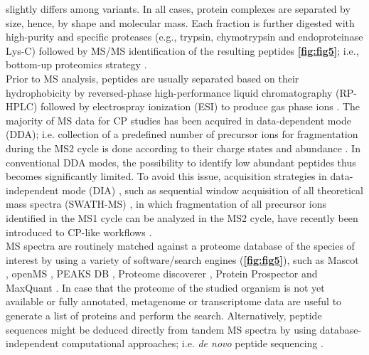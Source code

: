 \newpage
slightly differs among variants. In all cases, protein complexes are separated by size, hence, by shape and molecular mass. Each fraction is further digested with high-purity and specific proteases (e.g., trypsin, chymotrypsin and endoproteinase Lys-C) followed by MS/MS identification of the resulting peptides \textbf{\autoref{fig:fig5}}; i.e., bottom-up proteomics strategy \cite{Zhang_2013}.\\
Prior to MS analysis, peptides are usually separated based on their hydrophobicity by reversed-phase high-performance liquid chromatography (RP-HPLC) followed by electrospray ionization (ESI) to produce gas phase ions \cite{Zhang_2013}. The majority of MS data for CP studies has been acquired in data-dependent mode (DDA); i.e. collection of a predefined number of precursor ions for fragmentation during the MS2 cycle is done according to their charge states and abundance \cite{Hu_2016}. In conventional DDA modes, the possibility to identify low abundant peptides thus becomes significantly limited. To avoid this issue, acquisition strategies in data-independent mode (DIA) \cite{Krasny_2021}, such as sequential window acquisition of all theoretical mass spectra (SWATH-MS) \cite{Gillet_2012}, in which fragmentation of all precursor ions identified in the MS1 cycle can be analyzed in the MS2 cycle, have recently been introduced to CP-like workflows \cite{Bludau_2020, Calvo_2020, Heusel_2019}.\\ 
MS spectra are routinely matched against a proteome database of the species of interest by using a variety of software/search engines (\textbf{\autoref{fig:fig5}}), such as Mascot \cite{Perkins_1999}, openMS \cite{Rost_2016}, PEAKS DB \cite{Zhang_2012}, Proteome discoverer \cite{Orsburn_2021}, Protein Prospector \cite{Chalkley_2005} and MaxQuant \cite{Tyanova_2016a}. In case that the proteome of the studied organism is not yet available or fully annotated, metagenome or transcriptome data are useful to generate a list of proteins and perform the search. Alternatively, peptide sequences might be deduced directly from tandem MS spectra by using database-independent computational approaches; i.e. \emph{de novo} peptide sequencing \cite{Tran_2017}.\\
